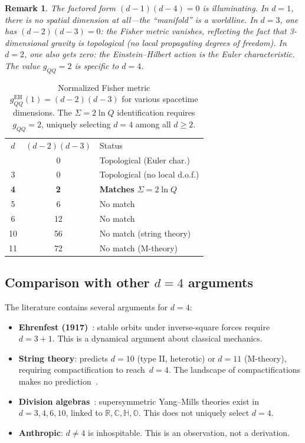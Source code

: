 \documentclass[prd,twocolumn,superscriptaddress,longbibliography]{revtex4-2}
\newtheorem*{remark}{Remark}
\begin{document}
\begin{remark}
The factored form $(d-1)(d-4)=0$ is illuminating.
In $d=1$, there is no spatial dimension at all---the
``manifold'' is a worldline.
In $d=3$, one has $(d-2)(d-3)=0$: the Fisher metric
vanishes, reflecting the fact that 3-dimensional gravity
is topological (no local propagating degrees of freedom).
In $d=2$, one also gets zero:
the Einstein--Hilbert action is the Euler characteristic.
The value $g_{QQ}=2$ is specific to $d=4$.
\end{remark}

\begin{table}[t]
\centering
\caption{Normalized Fisher metric
$g_{QQ}^{\mathrm{EH}}(1) = (d-2)(d-3)$ for various
spacetime dimensions.
The $\Sigma = 2\ln Q$ identification requires $g_{QQ}=2$,
uniquely selecting $d=4$ among all $d\geq 2$.}
\label{tab:dimensions}
\begin{ruledtabular}
\begin{tabular}{ccl}
$d$ & $(d-2)(d-3)$ & Status \\
\colrule
2  &  0 & Topological (Euler char.) \\
3  &  0 & Topological (no local d.o.f.) \\
\textbf{4} & \textbf{2} & \textbf{Matches $\Sigma=2\ln Q$} \\
5  &  6 & No match \\
6  & 12 & No match \\
10 & 56 & No match (string theory) \\
11 & 72 & No match (M-theory) \\
\end{tabular}
\end{ruledtabular}
\end{table}

\subsection{Comparison with other $d=4$ arguments}

The literature contains several arguments for $d=4$:
\begin{itemize}
\item \textbf{Ehrenfest (1917)}~\cite{Ehrenfest1917}:
  stable orbits under inverse-square forces require
  $d=3+1$.
  This is a dynamical argument about classical mechanics.
\item \textbf{String theory}: predicts $d=10$ (type II,
  heterotic) or $d=11$ (M-theory), requiring
  compactification to reach~$d=4$.
  The landscape of compactifications makes no
  prediction~\cite{Polchinski1998}.
\item \textbf{Division algebras}~\cite{BaezHuerta2010}:
  supersymmetric Yang--Mills theories exist in
  $d=3,4,6,10$, linked to
  $\mathbb{R},\mathbb{C},\mathbb{H},\mathbb{O}$.
  This does not uniquely select $d=4$.
\item \textbf{Anthropic}: $d\ne 4$ is inhospitable.
  This is an observation, not a derivation.
\end{itemize}
\end{document}
